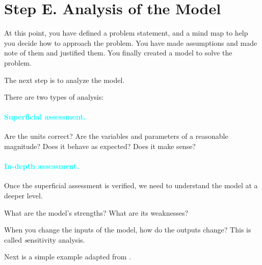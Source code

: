 \section*{Step E. Analysis of the Model}\label{analysis}


At this point, you have defined a problem statement, and a mind map to help you decide how to approach the problem. You have made assumptions and made note of them and justified them.
You finally created a model to solve the problem.

The next step is to analyze the model.

There are two types of analysis:


\paragraph{\textcolor{cyan}{\textbf{Superficial assessment.}}} Are the units correct? Are the variables and parameters of a reasonable magnitude? Does it behave as expected? Does it make sense?



\paragraph{\textcolor{cyan}{\textbf{In-depth assessment.}}} Once the superficial assessment is verified, we need to understand the model at a deeper level. 

What are the model's strengths? What are its weaknesses?

When you change the inputs of the model, how do the outputs change? This is called {\emph sensitivity analysis}. 


Next is a simple example adapted from \cite{bliss}.


\begin{annotation}
	\begin{goals}
	\hfill {}	
	\end{goals}
\end{annotation}

